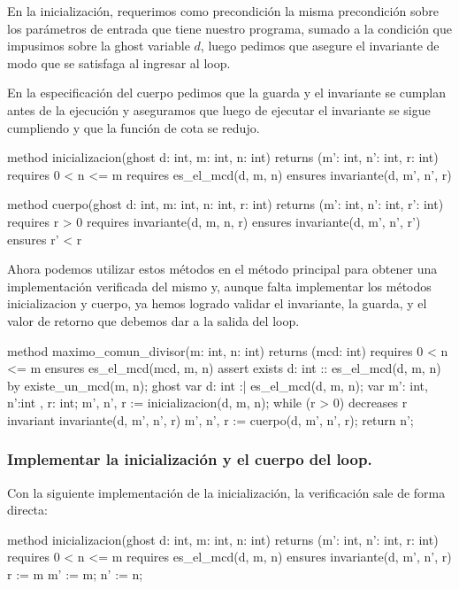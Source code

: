 \documentclass[12pt, a4paper, openany, fleqn]{book}
\begin{document}
    En la inicialización, requerimos como precondición la misma precondición sobre los parámetros de entrada que tiene nuestro programa, sumado a la condición que impusimos sobre la ghost variable $d$, luego pedimos que asegure el invariante de modo que se satisfaga al ingresar al loop.

    En la especificación del cuerpo pedimos que la guarda y el invariante se cumplan antes de la ejecución y aseguramos que luego de ejecutar el invariante se sigue cumpliendo y que la función de cota se redujo.

    \begin{dafny}
method inicializacion(ghost d: int, m: int, n: int)
    returns (m': int, n': int, r: int)
    requires 0 < n <= m
    requires es_el_mcd(d, m, n)
    ensures invariante(d, m', n', r)

method cuerpo(ghost d: int, m: int, n: int, r: int)
    returns (m': int, n': int, r': int)
    requires r > 0
    requires invariante(d, m, n, r)
    ensures invariante(d, m', n', r')
    ensures r' < r
    \end{dafny}

    Ahora podemos utilizar estos métodos  en el método principal para obtener una implementación verificada del mismo y, aunque falta implementar los métodos inicializacion y cuerpo, ya hemos logrado validar el invariante, la guarda, y el valor de retorno que debemos dar a la salida del loop.

    \begin{dafny}
method maximo_comun_divisor(m: int, n: int) returns (mcd: int)
    requires 0 < n <= m
    ensures es_el_mcd(mcd, m, n)
{
    assert exists d: int :: es_el_mcd(d, m, n) by {
        existe_un_mcd(m, n);
    }
    ghost var d: int :| es_el_mcd(d, m, n);
    var m': int, n':int , r: int;
    m', n', r := inicializacion(d, m, n);
    while (r > 0)
        decreases r
        invariant invariante(d, m', n', r)
    {
         m', n', r := cuerpo(d, m', n', r);
    }
    return n';
}
    \end{dafny}

    \subsubsection*{Implementar la inicialización y el cuerpo del loop.}

    Con la siguiente implementación de la inicialización, la verificación sale de forma directa:
    \begin{dafny}
method inicializacion(ghost d: int, m: int, n: int)
    returns (m': int, n': int, r: int)
    requires 0 < n <= m
    requires es_el_mcd(d, m, n)
    ensures invariante(d, m', n', r)
    {
        r := m %
        m' := m;
        n' := n;
    }
    \end{dafny}
\end{document}
